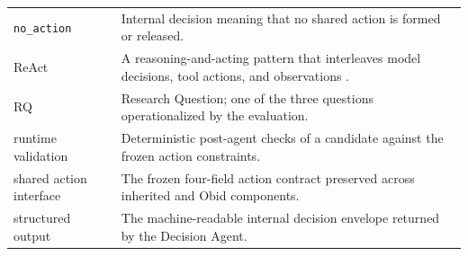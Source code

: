 \begin{tabularx}{\textwidth}{@{}L{0.30\textwidth}Y@{}}
\texttt{no\_action} & Internal decision meaning that no shared action is formed or released. \\
ReAct & A reasoning-and-acting pattern that interleaves model decisions, tool actions, and observations \cite{yao2023react}. \\
RQ & Research Question; one of the three questions operationalized by the evaluation. \\
runtime validation & Deterministic post-agent checks of a candidate against the frozen action constraints. \\
shared action interface & The frozen four-field action contract preserved across inherited and Obid components. \\
structured output & The machine-readable internal decision envelope returned by the Decision Agent. \\
\bottomrule
\end{tabularx}
\renewcommand{\arraystretch}{1}
\endgroup
